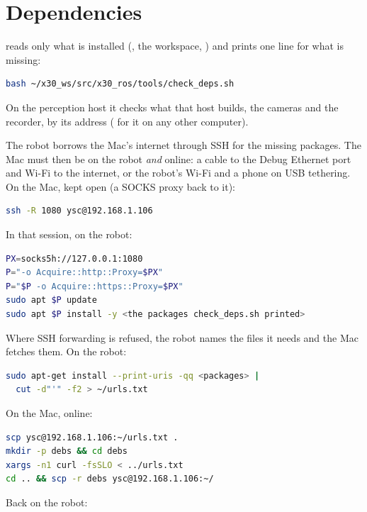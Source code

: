 \section{Dependencies}
\label{sec:i-apt}

 reads only what is installed (, the workspace,
) and prints one  line for what is missing:

\begin{lstlisting}[language=bash]
bash ~/x30_ws/src/x30_ros/tools/check_deps.sh
\end{lstlisting}

On the perception host it checks what that host builds, the cameras and the recorder, by its
address ( for it on any other computer).

The robot borrows the Mac's internet through SSH for the missing packages. The Mac must then be
on the robot \emph{and} online: a cable to the Debug Ethernet port and Wi-Fi to the internet, or
the robot's Wi-Fi and a phone on USB tethering. On the Mac, kept open (a SOCKS proxy back to it):

\begin{lstlisting}[language=bash]
ssh -R 1080 ysc@192.168.1.106
\end{lstlisting}

In that session, on the robot:

\begin{lstlisting}[language=bash]
PX=socks5h://127.0.0.1:1080
P="-o Acquire::http::Proxy=$PX"
P="$P -o Acquire::https::Proxy=$PX"
sudo apt $P update
sudo apt $P install -y <the packages check_deps.sh printed>
\end{lstlisting}

Where SSH forwarding is refused, the robot names the files it needs and the Mac fetches them.
On the robot:

\begin{lstlisting}[language=bash]
sudo apt-get install --print-uris -qq <packages> |
  cut -d"'" -f2 > ~/urls.txt
\end{lstlisting}

On the Mac, online:

\begin{lstlisting}[language=bash]
scp ysc@192.168.1.106:~/urls.txt .
mkdir -p debs && cd debs
xargs -n1 curl -fsSLO < ../urls.txt
cd .. && scp -r debs ysc@192.168.1.106:~/
\end{lstlisting}

Back on the robot:

